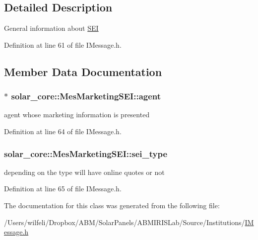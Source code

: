 \subsection{Detailed Description}
General information about \hyperlink{classsolar__core_1_1_s_e_i}{S\+E\+I} 

Definition at line 61 of file I\+Message.\+h.



\subsection{Member Data Documentation}
\hypertarget{classsolar__core_1_1_mes_marketing_s_e_i_a5bc5eb8bf309e6ba96cfdc0feb01baa9}{}
\subsubsection[{agent}]{$\ast$ solar\+\_\+core\+::\+Mes\+Marketing\+S\+E\+I\+::agent}\label{classsolar__core_1_1_mes_marketing_s_e_i_a5bc5eb8bf309e6ba96cfdc0feb01baa9}
agent whose marketing information is presented 

Definition at line 64 of file I\+Message.\+h.

\hypertarget{classsolar__core_1_1_mes_marketing_s_e_i_a8897df83278137d8ff4b04c068e4370e}{}
\subsubsection[{sei\+\_\+type}]{ solar\+\_\+core\+::\+Mes\+Marketing\+S\+E\+I\+::sei\+\_\+type}\label{classsolar__core_1_1_mes_marketing_s_e_i_a8897df83278137d8ff4b04c068e4370e}
depending on the type will have online quotes or not 

Definition at line 65 of file I\+Message.\+h.



The documentation for this class was generated from the following file\+:\begin{DoxyCompactItemize}
\item 
/\+Users/wilfeli/\+Dropbox/\+A\+B\+M/\+Solar\+Panels/\+A\+B\+M\+I\+R\+I\+S\+Lab/\+Source/\+Institutions/\hyperlink{_i_message_8h}{I\+Message.\+h}\end{DoxyCompactItemize}
